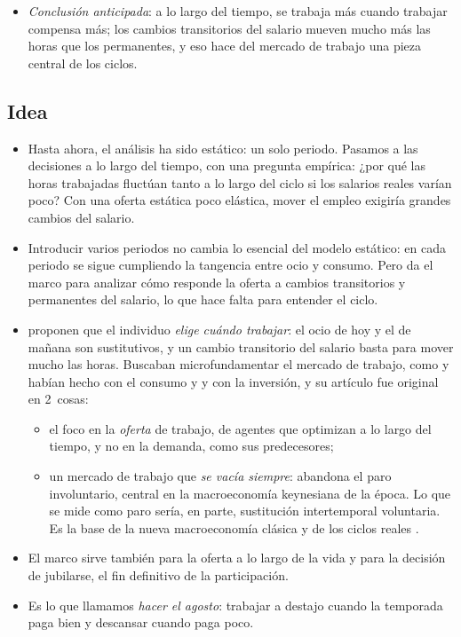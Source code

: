 \documentclass[11pt]{article}
\begin{document}
\begin{itemize}
\item \emph{Conclusión anticipada}: a lo largo del tiempo, se trabaja más cuando trabajar compensa más; los cambios transitorios del salario mueven mucho más las horas que los permanentes, y eso hace del mercado de trabajo una pieza central de los ciclos.
\end{itemize}

\subsection{Idea}\label{sec:lr-idea}

\begin{itemize}
\item Hasta ahora, el análisis ha sido estático: un solo periodo. Pasamos a las decisiones a lo largo del tiempo, con una pregunta empírica: ¿por qué las horas trabajadas fluctúan tanto a lo largo del ciclo si los salarios reales varían poco? Con una oferta estática poco elástica, mover el empleo exigiría grandes cambios del salario.
\item Introducir varios periodos no cambia lo esencial del modelo estático: en cada periodo se sigue cumpliendo la tangencia entre ocio y consumo. Pero da el marco para analizar cómo responde la oferta a cambios transitorios y permanentes del salario, lo que hace falta para entender el ciclo.
\item \textcite{LucasRapping1969Real} proponen que el individuo \emph{elige cuándo trabajar}: el ocio de hoy y el de mañana son sustitutivos, y un cambio transitorio del salario basta para mover mucho las horas. Buscaban microfundamentar el mercado de trabajo, como  y  habían hecho con el consumo  y  y  con la inversión, y su artículo fue original en 2~cosas:
  \begin{itemize}
  \item el foco en la \emph{oferta} de trabajo, de agentes que optimizan a lo largo del tiempo, y no en la demanda, como sus predecesores;
  \item un mercado de trabajo que \emph{se vacía siempre}: abandona el paro involuntario, central en la macroeconomía keynesiana de la época. Lo que se mide como paro sería, en parte, sustitución intertemporal voluntaria. Es la base de la nueva macroeconomía clásica  y de los ciclos reales .
  \end{itemize}
\item El marco sirve también para la oferta a lo largo de la vida y para la decisión de jubilarse, el fin definitivo de la participación.
\item Es lo que llamamos \emph{hacer el agosto}: trabajar a destajo cuando la temporada paga bien y descansar cuando paga poco.
\end{itemize}
\end{document}

